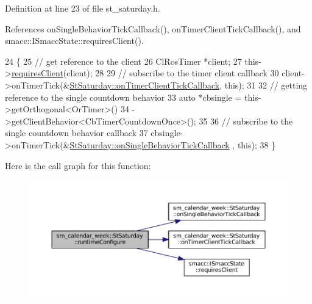 Definition at line 23 of file st\+\_\+saturday.\+h.



References on\+Single\+Behavior\+Tick\+Callback(), on\+Timer\+Client\+Tick\+Callback(), and smacc\+::\+I\+Smacc\+State\+::requires\+Client().


\begin{DoxyCode}
24     \{
25         \textcolor{comment}{// get reference to the client}
26         ClRosTimer *client;
27         this->\hyperlink{classsmacc_1_1ISmaccState_a7f95c9f0a6ea2d6f18d1aec0519de4ac}{requiresClient}(client);
28 
29         \textcolor{comment}{// subscribe to the timer client callback}
30         client->onTimerTick(&\hyperlink{structsm__calendar__week_1_1StSaturday_a6723b8838cba941546ab4e82579cdf8b}{StSaturday::onTimerClientTickCallback}, \textcolor{keyword}{
      this});
31 
32         \textcolor{comment}{// getting reference to the single countdown behavior}
33         \textcolor{keyword}{auto} *cbsingle = this->getOrthogonal<OrTimer>()
34                              ->getClientBehavior<CbTimerCountdownOnce>();
35 
36         \textcolor{comment}{// subscribe to the single countdown behavior callback}
37         cbsingle->onTimerTick(&\hyperlink{structsm__calendar__week_1_1StSaturday_aed7bdd2807a17906d8c107c821117448}{StSaturday::onSingleBehaviorTickCallback}
      , \textcolor{keyword}{this});
38     \}
\end{DoxyCode}
Here is the call graph for this function\+:
\nopagebreak
\begin{figure}[H]
\begin{center}
\leavevmode
\includegraphics[width=350pt]{structsm__calendar__week_1_1StSaturday_a3552be67b39ddaec030b7efc8909741b_cgraph}
\end{center}
\end{figure}
\mbox{\label{structsm__calendar__week_1_1StSaturday_a3cf24c07476dab0e76c90e5d5164bd5a}} 
